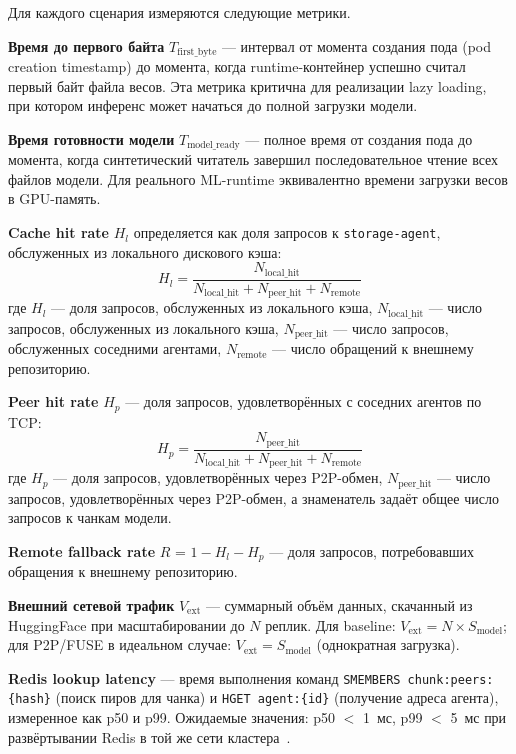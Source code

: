 Для каждого сценария измеряются следующие метрики.

\textbf{Время до первого байта} $T_{\mathrm{first\_byte}}$ --- интервал от момента создания пода (pod creation timestamp) до момента, когда runtime-контейнер успешно считал первый байт файла весов. Эта метрика критична для реализации lazy loading, при котором инференс может начаться до полной загрузки модели.

\textbf{Время готовности модели} $T_{\mathrm{model\_ready}}$ --- полное время от создания пода до момента, когда синтетический читатель завершил последовательное чтение всех файлов модели. Для реального ML-runtime эквивалентно времени загрузки весов в GPU-память.

\textbf{Cache hit rate} $H_l$ определяется как доля запросов к \texttt{storage-agent}, обслуженных из локального дискового кэша:
\begin{equation}
  H_l = \frac{N_{\mathrm{local\_hit}}}{N_{\mathrm{local\_hit}} + N_{\mathrm{peer\_hit}} + N_{\mathrm{remote}}}
\end{equation}
где $H_l$ --- доля запросов, обслуженных из локального кэша, $N_{\mathrm{local\_hit}}$ --- число запросов, обслуженных из локального кэша, $N_{\mathrm{peer\_hit}}$ --- число запросов, обслуженных соседними агентами, $N_{\mathrm{remote}}$ --- число обращений к внешнему репозиторию.

\textbf{Peer hit rate} $H_p$ --- доля запросов, удовлетворённых с соседних агентов по TCP:
\begin{equation}
  H_p = \frac{N_{\mathrm{peer\_hit}}}{N_{\mathrm{local\_hit}} + N_{\mathrm{peer\_hit}} + N_{\mathrm{remote}}}
\end{equation}
где $H_p$ --- доля запросов, удовлетворённых через P2P-обмен, $N_{\mathrm{peer\_hit}}$ --- число запросов, удовлетворённых через P2P-обмен, а знаменатель задаёт общее число запросов к чанкам модели.

\textbf{Remote fallback rate} $R$ = $1 - H_l - H_p$ --- доля запросов, потребовавших обращения к внешнему репозиторию.

\textbf{Внешний сетевой трафик} $V_{\mathrm{ext}}$ --- суммарный объём данных, скачанный из HuggingFace при масштабировании до $N$ реплик. Для baseline: $V_{\mathrm{ext}} = N \times S_{\mathrm{model}}$; для P2P/FUSE в идеальном случае: $V_{\mathrm{ext}} = S_{\mathrm{model}}$ (однократная загрузка).

\textbf{Redis lookup latency} --- время выполнения команд \texttt{SMEMBERS chunk:peers:\{hash\}} (поиск пиров для чанка) и \texttt{HGET agent:\{id\}} (получение адреса агента), измеренное как p50 и p99. Ожидаемые значения: p50 $<$ 1~мс, p99 $<$ 5~мс при развёртывании Redis в той же сети кластера~\cite{redis_sentinel_docs}.

